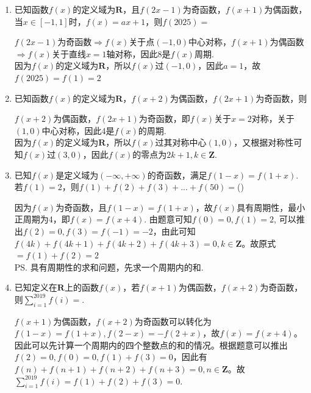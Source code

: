 \begin{enumerate}
    \begin{jieda}
        $f(-2.5) = f(-0.5) = -f(0.5) = -(0.5 \cdot (1-0.5)) = -0.25$
    \end{jieda}
    \item 已知函数$f(x)$的定义域为$\mathbf{R}$，且$f(2x-1)$为奇函数，$f(x+1)$为偶函数，当$x \in [-1, 1]$时，$f(x) = ax+1$，则$f(2025) = $
    \begin{jieda}
        $f(2x-1)$为奇函数$\Longrightarrow f(x)$关于点$(-1, 0)$中心对称，$f(x+1)$为偶函数$\Longrightarrow f(x)$关于直线$x = 1$轴对称，因此8是$f(x)$周期. \\
        因为$f(x)$的定义域为$\mathbf{R}$，所以$f(x)$过$(-1, 0)$，因此$a = 1$，故$f(2025) = f(1) = 2$
    \end{jieda}
    \item 已知函数$f(x)$的定义域为$\mathbf{R}$，$f(x+2)$为偶函数，$f(2x+1)$为奇函数，则
    \begin{jieda}
        $f(x+2)$为偶函数，$f(2x+1)$为奇函数，即$f(x)$关于$x = 2$对称，关于$(1, 0)$中心对称，因此4是$f(x)$的周期. \\
        因为$f(x)$的定义域为$\mathbf{R}$，所以$f(x)$过其对称中心$(1, 0)$，又根据对称性可知$f(x)$过$(3, 0)$，因此$f(x)$的零点为$2k+1, k \in \mathbf{Z}$.
    \end{jieda}
    \item 已知$f(x)$是定义域为$(-\infty, +\infty)$的奇函数，满足$f(1-x) = f(1+x)$. 若$f(1) = 2$，则$f(1)+f(2)+f(3)+...+f(50) = $\dotfill()
    \begin{jieda}
        因为$f(x)$为奇函数，且$f(1-x) = f(1+x)$，故$f(x)$具有周期性，最小正周期为4，即$f(x) = f(x+4)$. 由题意可知$f(0) = 0, f(1) = 2$, 可以推出$f(2) = 0, f(3) = f(-1) = -2$，由此可知$f(4k)+f(4k+1)+f(4k+2)+f(4k+3)=0, k \in \mathbf{Z}$。故原式$= f(1) + f(2) = 2$ \\
        \ps 具有周期性的求和问题，先求一个周期内的和.
    \end{jieda}
    \item 已知定义在$\mathbf{R}$上的函数$f(x)$，若$f(x+1)$为偶函数，$f(x+2)$为奇函数，则$\sum_{i=1}^{2019} f(i) = $.
    \begin{jieda}
        $f(x+1)$为偶函数，$f(x+2)$为奇函数可以转化为$f(1-x) = f(1+x), f(2-x) = -f(2+x)$，故$f(x) = f(x+4)$。因此可以先计算一个周期内的四个整数点的和的情况。根据题意可以推出$f(2) = 0, f(0) = 0, f(1) + f(3) = 0$，因此有$f(n) + f(n+1) + f(n+2) + f(n+3) = 0, n \in \mathbf{Z}$。故$\sum_{i=1}^{2019} f(i) = f(1) + f(2) + f(3) = 0$.

\end{jieda}
\end{enumerate}
